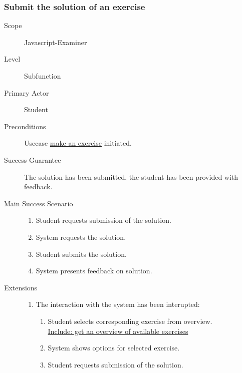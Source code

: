 \subsubsection{Submit the solution of an exercise}
\begin{mdframed} [rightmargin=-100pt]
\begin{description}
  \item[Scope] Javascript-Examiner
  \item[Level] Subfunction
  \item[Primary Actor] Student
  \item[Preconditions] Usecase \underline{make an exercise} initiated.
  \item[Success Guarantee] The solution has been submitted, the student has been
    provided with feedback.
  \item[Main Success Scenario] \mbox{}
    \begin{enumerate}
		\item Student requests submission of the solution.
		\item System requests the solution.
		\item Student submits the solution.
		\item System presents feedback on solution.
    \end{enumerate} 
  \item[Extensions] \mbox{}
	\begin{enumerate}
      \renewcommand{\labelenumi}{\theenumi a.}
	  \item The interaction with the system has been interupted:
		\begin{enumerate}[(1)]
		  \renewcommand{\labelenumii}{\theenumii .}
		  \item Student selects corresponding exercise from overview. \\
		    \underline{Include: get an overview of available exercises}
		  \item System shows options for selected exercise.
		  \item Student requests submission of the solution.
		\end{enumerate}
	\end{enumerate}
\end{description}
\end{mdframed}
